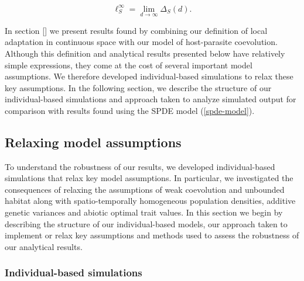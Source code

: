 \documentclass{article}
\begin{document}
\begin{equation}\label{la-cont-sp}
  \ell_S^\infty=\lim_{d\to\infty}\Delta_S(d).
\end{equation}

In section \ref{} we present results found by combining our definition
of local adaptation in continuous space with our model of host-parasite
coevolution. Although this definition and analytical results presented
below have relatively simple expressions, they come at the cost of
several important model assumptions. We therefore developed
individual-based simulations to relax these key assumptions. In the
following section, we describe the structure of our individual-based
simulations and approach taken to analyze simulated output for
comparison with results found using the SPDE model (\ref{spde-model}).

\hypertarget{relaxing-model-assumptions}{%
\subsection{\texorpdfstring{Relaxing model assumptions
\label{ibs}}{Relaxing model assumptions }}\label{relaxing-model-assumptions}}

To understand the robustness of our results, we developed
individual-based simulations that relax key model assumptions. In
particular, we investigated the consequences of relaxing the assumptions
of weak coevolution and unbounded habitat along with spatio-temporally
homogeneous population densities, additive genetic variances and abiotic
optimal trait values. In this section we begin by describing the
structure of our individual-based models, our approach taken to
implement or relax key assumptions and methods used to assess the
robustness of our analytical results.

\hypertarget{individual-based-simulations}{%
\subsubsection{Individual-based
simulations}\label{individual-based-simulations}}
\end{document}
